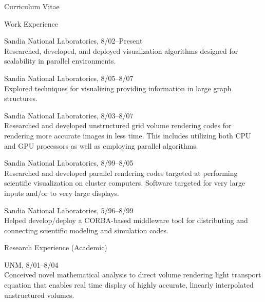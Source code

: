\documentclass{article}
\begin{document}
\begin{cv}{Curriculum Vitae}
    \begin{cvlist}{Work Experience}
    \item[Scalable Visualization] Sandia National Laboratories, 8/02--Present \\
      Researched, developed, and deployed visualization algorithms designed
      for scalability in parallel environments.
    \item[Graph Visualization] Sandia National Laboratories, 8/05--8/07 \\
      Explored techniques for visualizing providing information in large
      graph structures.
    \item[Volume Rendering] Sandia National Laboratories, 8/03--8/07 \\
      Researched and developed unstructured grid volume rendering codes for
      rendering more accurate images in less time.  This includes utilizing
      both CPU and GPU processors as well as employing parallel algorithms.
    \item[Scalable Rendering] Sandia National Laboratories, 8/99--8/05 \\
      Researched and developed parallel rendering codes targeted at
      performing scientific visualization on cluster computers.  Software
      targeted for very large inputs and/or to very large displays.
    \item[Product Realization Environment] Sandia National Laboratories,
      5/96--8/99 \\
      Helped develop/deploy a CORBA-based middleware tool for distributing
      and connecting scientific modeling and simulation codes.
    \end{cvlist}

    \begin{cvlist}{Research Experience (Academic)}
    \item[Doctoral Research] UNM, 8/01--8/04 \\
      Conceived novel mathematical analysis to direct volume rendering
      light transport equation that enables real time display of highly
      accurate, linearly interpolated unstructured volumes.
    \end{cvlist}


\end{cv}
\end{document}
